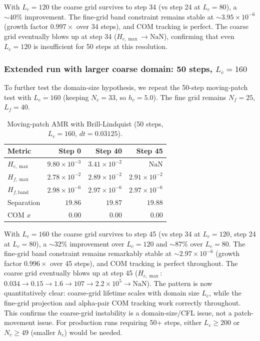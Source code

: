 With $L_c=120$ the coarse grid survives to step 34 (vs step 24 at $L_c=80$), a $\sim 40\%$ improvement. The fine-grid band constraint remains stable at $\sim 3.95\times 10^{-6}$ (growth factor $0.997\times$ over 34 steps), and COM tracking is perfect. The coarse grid eventually blows up at step 34 ($H_{c,\max} \to \text{NaN}$), confirming that even $L_c=120$ is insufficient for 50 steps at this resolution.

\subsubsection{Extended run with larger coarse domain: 50 steps, $L_c=160$}

To further test the domain-size hypothesis, we repeat the 50-step moving-patch test with $L_c=160$ (keeping $N_c=33$, so $h_c=5.0$). The fine grid remains $N_f=25$, $L_f=40$.

\begin{table}[t]
\centering
\caption{Moving-patch AMR with Brill-Lindquist (50 steps, $L_c=160$, $dt=0.03125$).}
\label{tab:amr-moving-50-Lc160}
\begin{tabular}{lrrr}
\hline
Metric & Step 0 & Step 40 & Step 45 \\
\hline
$H_{c,\max}$ & $9.80\times 10^{-3}$ & $3.41\times 10^{-2}$ & $\text{NaN}$ \\
$H_{f,\max}$ & $2.78\times 10^{-2}$ & $2.89\times 10^{-2}$ & $2.91\times 10^{-2}$ \\
$H_{f,\text{band}}$ & $2.98\times 10^{-6}$ & $2.97\times 10^{-6}$ & $2.97\times 10^{-6}$ \\
Separation & $19.86$ & $19.87$ & $19.88$ \\
COM $x$ & $0.00$ & $0.00$ & $0.00$ \\
\hline
\end{tabular}
\end{table}

With $L_c=160$ the coarse grid survives to step 45 (vs step 34 at $L_c=120$, step 24 at $L_c=80$), a $\sim 32\%$ improvement over $L_c=120$ and $\sim 87\%$ over $L_c=80$. The fine-grid band constraint remains remarkably stable at $\sim 2.97\times 10^{-6}$ (growth factor $0.996\times$ over 45 steps), and COM tracking is perfect throughout. The coarse grid eventually blows up at step 45 ($H_{c,\max}$: $0.034 \to 0.15 \to 1.6 \to 107 \to 2.2\times 10^5 \to \text{NaN}$). The pattern is now quantitatively clear: coarse-grid lifetime scales with domain size $L_c$, while the fine-grid projection and alpha-pair COM tracking work correctly throughout. This confirms the coarse-grid instability is a domain-size/CFL issue, not a patch-movement issue. For production runs requiring 50+ steps, either $L_c \ge 200$ or $N_c \ge 49$ (smaller $h_c$) would be needed.

